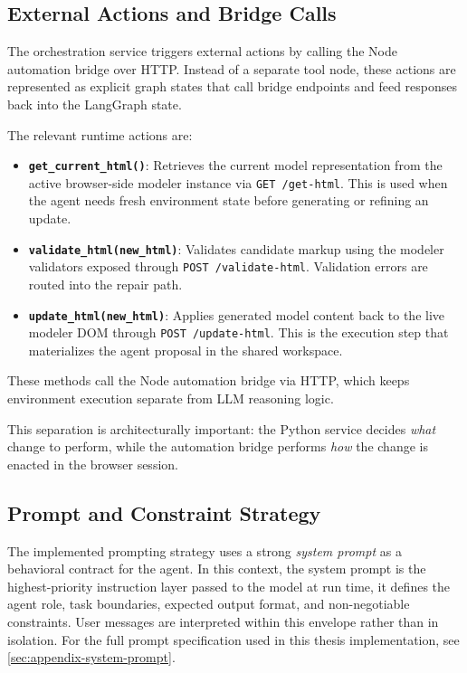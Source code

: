 \subsection{External Actions and Bridge Calls}
The orchestration service triggers external actions by calling the Node automation bridge over HTTP. Instead of a separate tool node, these actions are represented as explicit graph states that call bridge endpoints and feed responses back into the LangGraph state.

The relevant runtime actions are:
\begin{itemize}
    \item \textbf{\texttt{get\_current\_html()}}: Retrieves the current model representation from the active browser-side modeler instance via \texttt{GET /get-html}. This is used when the agent needs fresh environment state before generating or refining an update.
    \item \textbf{\texttt{validate\_html(new\_html)}}: Validates candidate markup using the modeler validators exposed through \texttt{POST /validate-html}. Validation errors are routed into the repair path.
    \item \textbf{\texttt{update\_html(new\_html)}}: Applies generated model content back to the live modeler DOM through \texttt{POST /update-html}. This is the execution step that materializes the agent proposal in the shared workspace.
\end{itemize}

These methods call the Node automation bridge via HTTP, which keeps environment execution separate from LLM reasoning logic.

This separation is architecturally important: the Python service decides \emph{what} change to perform, while the automation bridge performs \emph{how} the change is enacted in the browser session.

\subsection{Prompt and Constraint Strategy}
The implemented prompting strategy uses a strong \emph{system prompt} as a behavioral contract for the agent. In this context, the system prompt is the highest-priority instruction layer passed to the model at run time, it defines the agent role, task boundaries, expected output format, and non-negotiable constraints. User messages are interpreted within this envelope rather than in isolation.
For the full prompt specification used in this thesis implementation, see \cref{sec:appendix-system-prompt}.

